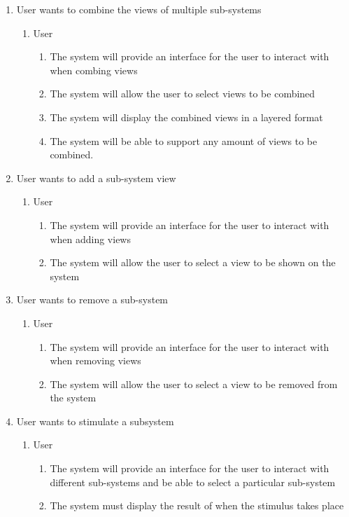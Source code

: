 \documentclass[12pt, titlepage]{article}
\begin{document}
\begin{enumerate}[{BE}1.]
	\item User wants to combine the views of multiple sub-systems
	\begin{enumerate}[{VP1}.1]
		\item User
			\begin{enumerate}
				\item The system will provide an interface for the user to interact with when combing views
				\item The system will allow the user to select views to be combined
				\item The system will display the combined views in a layered format
				\item The system will be able to support any amount of views to be combined.
			\end{enumerate}
	\end{enumerate}
	
	\item User wants to add a sub-system view
	\begin{enumerate}[{VP2}.1]
		\item User
			\begin{enumerate}
				\item The system will provide an interface for the user to interact with when adding views
				\item The system will allow the user to select a view to be shown on the system
			\end{enumerate}
	\end{enumerate}
	
	\item User wants to remove a sub-system
	\begin{enumerate}[{VP3}.1]
		\item User
			\begin{enumerate}
				\item The system will provide an interface for the user to interact with when removing views
				\item The system will allow the user to select a view to be removed from the system
			\end{enumerate}
	\end{enumerate}
	
	\item User wants to stimulate a subsystem
	\begin{enumerate}[{VP4}.1]
		\item User
			\begin{enumerate}
				\item The system will provide an interface for the user to interact with different sub-systems and be able to select a particular sub-system
				\item The system must display the result of when the stimulus takes place
			\end{enumerate}
	\end{enumerate}
	

\end{enumerate}
\end{document}
